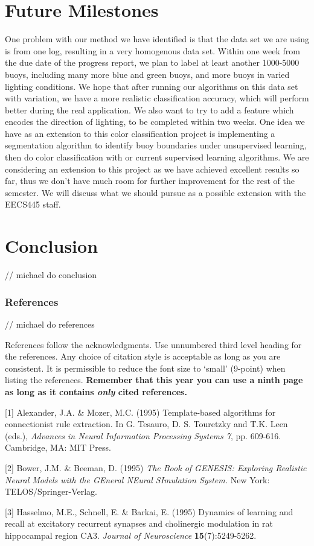 \documentclass{article} %
\begin{document}
\section{Future Milestones}
One problem with our method we have identified is that the data set we are using is from one log, resulting in a very
homogenous data set. Within one week from the due date of the progress report, we plan to label at least another 1000-5000 
buoys, including many more blue and green buoys, and more buoys in varied lighting conditions. We hope that after running
our algorithms on this data set with variation, we have a more realistic classification accuracy, which will perform better
during the real application. We also want to try to add a feature which encodes the direction of lighting, to be completed
within two weeks. One idea we have as an extension to this color classification project is implementing a segmentation 
algorithm to identify buoy boundaries under unsupervised learning, then do color classification with or current supervised 
learning algorithms. We are considering an extension to this project as we have achieved excellent results so far, thus
we don't have much room for further improvement for the rest of the semester. We will discuss what we should pursue as
a possible extension with the EECS445 staff. 
 

\section{Conclusion}

// michael do conclusion

\subsubsection*{References}

// michael do references

References follow the acknowledgments. Use unnumbered third level heading for
the references. Any choice of citation style is acceptable as long as you are
consistent. It is permissible to reduce the font size to `small' (9-point) 
when listing the references. {\bf Remember that this year you can use
a ninth page as long as it contains \emph{only} cited references.}

\small{
[1] Alexander, J.A. \& Mozer, M.C. (1995) Template-based algorithms
for connectionist rule extraction. In G. Tesauro, D. S. Touretzky
and T.K. Leen (eds.), {\it Advances in Neural Information Processing
Systems 7}, pp. 609-616. Cambridge, MA: MIT Press.

[2] Bower, J.M. \& Beeman, D. (1995) {\it The Book of GENESIS: Exploring
Realistic Neural Models with the GEneral NEural SImulation System.}
New York: TELOS/Springer-Verlag.

[3] Hasselmo, M.E., Schnell, E. \& Barkai, E. (1995) Dynamics of learning
and recall at excitatory recurrent synapses and cholinergic modulation
in rat hippocampal region CA3. {\it Journal of Neuroscience}
{\bf 15}(7):5249-5262.
}
\end{document}
